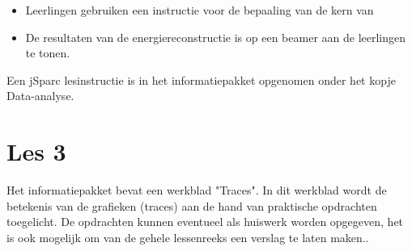 \begin{itemize}
\item Leerlingen gebruiken een instructie voor de bepaaling van de kern van 
\item De resultaten van de energiereconstructie is op een beamer aan de leerlingen te tonen.
\end{itemize}

Een jSparc lesinstructie is in het informatiepakket opgenomen onder het kopje Data-analyse.


\section{Les 3}
Het informatiepakket bevat een werkblad "Traces". In dit werkblad wordt de betekenis van de grafieken (traces) aan de hand van praktische opdrachten toegelicht. De opdrachten kunnen eventueel als huiswerk worden opgegeven, het is ook mogelijk om van de gehele lessenreeks een verslag te laten maken.. 


